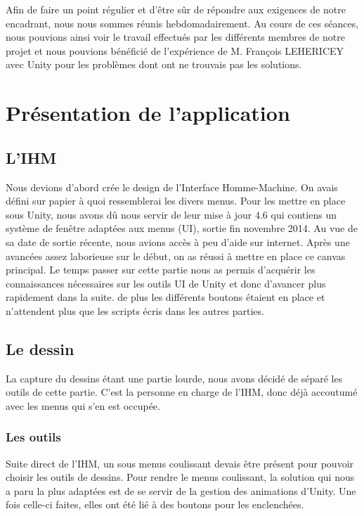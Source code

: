 \documentclass[a4paper,11pt]{article}
\begin{document}
	Afin de faire un point régulier et d'être sûr de répondre aux exigences de notre encadrant, nous nous sommes réunis hebdomadairement. Au cours de ces séances, nous pouvions ainsi voir le travail effectués par les différents membres de notre projet et nous pouvions bénéficié de l'expérience de M. François LEHERICEY avec Unity pour les problèmes dont ont ne trouvais pas les solutions.
	\section{Présentation de l'application}
		\subsection{L'IHM}
			Nous devions d'abord crée le design de l'Interface Homme-Machine. On avais défini sur papier à quoi ressemblerai les divers menus. Pour les mettre en place sous Unity, nous avons dû nous servir de leur mise à jour 4.6 qui contiens un système de fenêtre adaptées aux menus (UI), sortie fin novembre 2014. Au vue de sa date de sortie récente, nous avions accès à peu d'aide sur internet. Après une avancées assez laborieuse sur le début, on as réussi à mettre en place ce canvas principal.
			Le temps passer sur cette partie nous as permis d'acquérir les connaissances nécessaires sur les outils UI de Unity et donc d'avancer plus rapidement dans la suite. de plus les différents boutons étaient en place et n'attendent plus que les scripts écris dans les autres parties.
		
		\subsection{Le dessin}
			La capture du dessins étant une partie lourde, nous avons décidé de séparé les outils de cette partie. C'est la personne en charge de l'IHM, donc déjà accoutumé avec les menus qui s'en est occupée.
		
		
			\subsubsection{Les outils}
				Suite direct de l'IHM, un sous menus coulissant devais être présent pour pouvoir choisir les outils de dessins. Pour rendre le menus coulissant, la solution qui nous a paru la plus adaptées est de se servir de la gestion des animations d'Unity. Une fois celle-ci faites, elles ont été lié à des boutons pour les enclenchées.  
				
\end{document}
